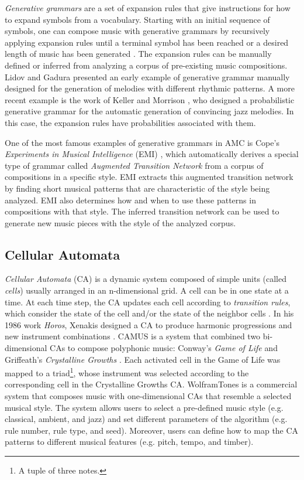\textit{Generative grammars} are a set of expansion rules that give instructions for how to expand symbols from a vocabulary. Starting with an initial sequence of symbols, one can compose music with generative grammars by recursively applying expansion rules until a terminal symbol has been reached or a desired length of music has been generated \cite{holtzman1981using}. The expansion rules can be manually defined or inferred from analyzing a corpus of pre-existing music compositions. Lidov and Gadura \cite{lidov1973melody} presented an early example of generative grammar manually designed for the generation of melodies with different rhythmic patterns. A more recent example is the work of Keller and Morrison \cite{keller2007grammatical}, who designed a probabilistic generative grammar for the automatic generation of convincing jazz melodies. In this case, the expansion rules have probabilities associated with them.

One of the most famous examples of generative grammars in AMC is Cope's \textit{Experiments in Musical Intelligence} (EMI) \cite{cope1989experiments}, which automatically derives a special type of grammar called \textit{Augmented Transition Network} from a corpus of compositions in a specific style. EMI extracts this augmented transition network by finding short musical patterns that are characteristic of the style being analyzed. EMI also determines how and when to use these patterns in compositions with that style. The inferred transition network can be used to generate new music pieces with the style of the analyzed corpus.

\subsection{Cellular Automata}

\textit{Cellular Automata} (CA) is a dynamic system composed of simple units (called \textit{cells}) usually arranged in an n-dimensional grid. A cell can be in one state at a time. At each time step, the CA updates each cell according to \textit{transition rules}, which consider the state of the cell and/or the state of the neighbor cells \cite{wolfram2002new}. In his 1986 work \textit{Horos}, Xenakis designed a CA to produce harmonic progressions and new instrument combinations \cite{solomos2005cellular}. CAMUS \cite{miranda1993cellular} is a system that combined two bi-dimensional CAs to compose polyphonic music: Conway's \textit{Game of Life} \cite{gardner1970} and Griffeath’s \textit{Crystalline Growths} \cite{dewdney1989}. Each activated cell in the Game of Life was mapped to a triad\footnote{A tuple of three notes.}, whose instrument was selected according to the corresponding cell in the Crystalline Growths CA. WolframTones \cite{ball2005making} is a commercial system that composes music with one-dimensional CAs that resemble a selected musical style. The system allows users to select a pre-defined music style (e.g. classical, ambient, and jazz) and set different parameters of the algorithm (e.g. rule number, rule type, and seed). Moreover, users can define how to map the CA patterns to different musical features (e.g. pitch, tempo, and timber).

